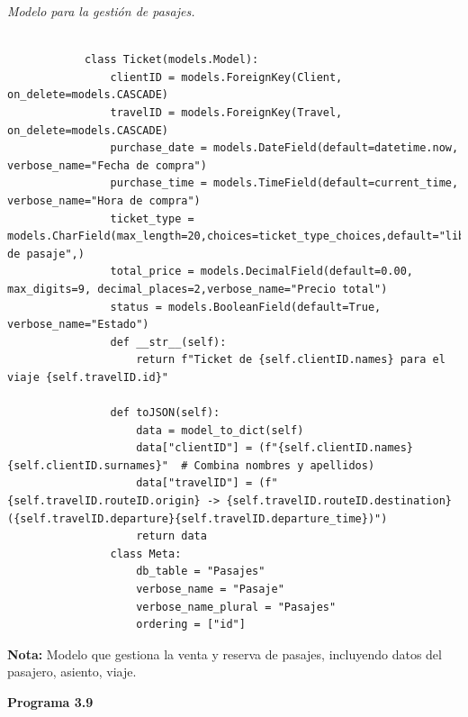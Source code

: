 		\textit{Modelo para la gestión de pasajes.} %
		\vspace{0.3cm} %
		\begin{lstlisting}[lineskip=-1pt]
			
			class Ticket(models.Model):
				clientID = models.ForeignKey(Client, on_delete=models.CASCADE)
				travelID = models.ForeignKey(Travel, on_delete=models.CASCADE)
				purchase_date = models.DateField(default=datetime.now, verbose_name="Fecha de compra")
				purchase_time = models.TimeField(default=current_time, verbose_name="Hora de compra")
				ticket_type = models.CharField(max_length=20,choices=ticket_type_choices,default="libre",verbose_name="Tipo de pasaje",)
				total_price = models.DecimalField(default=0.00, max_digits=9, decimal_places=2,verbose_name="Precio total")
				status = models.BooleanField(default=True, verbose_name="Estado")			
				def __str__(self):
					return f"Ticket de {self.clientID.names} para el viaje {self.travelID.id}"
			
				def toJSON(self):
					data = model_to_dict(self)
					data["clientID"] = (f"{self.clientID.names} {self.clientID.surnames}"  # Combina nombres y apellidos)
					data["travelID"] = (f"{self.travelID.routeID.origin} -> {self.travelID.routeID.destination} ({self.travelID.departure}{self.travelID.departure_time})")
					return data
				class Meta:
					db_table = "Pasajes"
					verbose_name = "Pasaje"
					verbose_name_plural = "Pasajes"
					ordering = ["id"]			
		\end{lstlisting}
		
		\textbf{Nota:} Modelo que gestiona la venta y reserva de pasajes, incluyendo datos del pasajero, asiento, viaje.
		
		\textbf{Programa 3.9}
		

